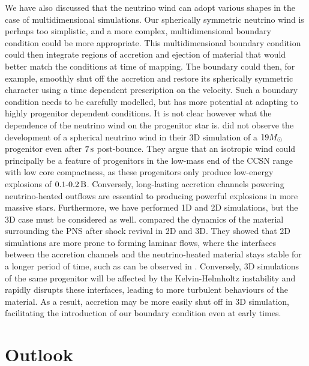 We have also discussed that the neutrino wind can adopt various shapes in the case of multidimensional simulations. Our spherically symmetric neutrino wind is perhaps too simplistic, and a more complex, multidimensional boundary condition could be more appropriate. This multidimensional boundary condition could then integrate regions of accretion and ejection of material that would better match the conditions at time of mapping. The boundary could then, for example, smoothly shut off the accretion and restore its spherically symmetric character using a time dependent prescription on the velocity. Such a boundary condition needs to be carefully modelled, but has more potential at adapting to highly progenitor dependent conditions. It is not clear however what the dependence of the neutrino wind on the progenitor star is. \cite{Bollig2021} did not observe the development of a spherical neutrino wind in their 3D simulation of a \(19M_{\odot}\) progenitor even after \(7\,\mathrm{s}\) post-bounce. They argue that an isotropic wind could principally be a feature of progenitors in the low-mass end of the CCSN range with low core compactness, as these progenitors only produce low-energy explosions of \(0.1\text{-}0.2\,\mathrm{B}\). Conversely, long-lasting accretion channels powering neutrino-heated outflows are essential to producing powerful explosions in more massive stars. Furthermore, we have performed 1D and 2D simulations, but the 3D case must be considered as well. \cite{Muller2015} compared the dynamics of the material surrounding the PNS after shock revival in 2D and 3D. They showed that 2D simulations are more prone to forming laminar flows, where the interfaces between the accretion channels and the neutrino-heated material stays stable for a longer period of time, such as can be observed in . Conversely, 3D simulations of the same progenitor will be affected by the Kelvin-Helmholtz instability and rapidly disrupts these interfaces, leading to more turbulent behaviours of the material. As a result, accretion may be more easily shut off in 3D simulation, facilitating the introduction of our boundary condition even at early times.

\section{Outlook}

